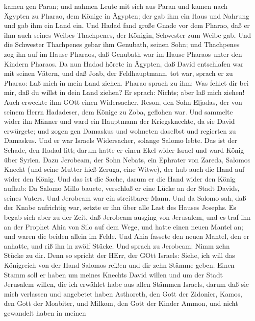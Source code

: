 kamen gen Paran; und nahmen Leute mit sich aus Paran und kamen nach
Ägypten zu Pharao, dem Könige in Ägypten; der gab ihm ein Haus und
Nahrung und gab ihm ein Land ein.  Und Hadad fand große
Gnade vor dem Pharao, daß er ihm auch seines Weibes Thachpenes, der
Königin, Schwester zum Weibe gab.  Und die Schwester
Thachpenes gebar ihm Genubath, seinen Sohn; und Thachpenes zog ihn auf
im Hause Pharaos, daß Genubath war im Hause Pharaos unter den Kindern
Pharaos.  Da nun Hadad hörete in Ägypten, daß David
entschlafen war mit seinen Vätern, und daß Joab, der Feldhauptmann, tot
war, sprach er zu Pharao: Laß mich in mein Land ziehen. 
Pharao sprach zu ihm: Was fehlet dir bei mir, daß du willst in dein Land
ziehen? Er sprach: Nichts; aber laß mich ziehen!  Auch
erweckte ihm GOtt einen Widersacher, Reson, den Sohn Eljadas, der von
seinem Herrn Hadadeser, dem Könige zu Zoba, geflohen war. 
Und sammelte wider ihn Männer und ward ein Hauptmann der Kriegsknechte,
da sie David erwürgete; und zogen gen Damaskus und wohneten daselbst und
regierten zu Damaskus.  Und er war Israels Widersacher,
solange Salomo lebte. Das ist der Schade, den Hadad litt; darum hatte er
einen Ekel wider Israel und ward König über Syrien.  Dazu
Jerobeam, der Sohn Nebats, ein Ephrater von Zareda, Salomos Knecht (und
seine Mutter hieß Zeruga, eine Witwe), der hub auch die Hand auf wider
den König.  Und das ist die Sache, darum er die Hand wider
den König aufhub: Da Salomo Millo bauete, verschloß er eine Lücke an der
Stadt Davids, seines Vaters.  Und Jerobeam war ein
streitbarer Mann. Und da Salomo sah, daß der Knabe aufrichtig war,
setzte er ihn über alle Last des Hauses Josephs.  Es begab
sich aber zu der Zeit, daß Jerobeam ausging von Jerusalem, und es traf
ihn an der Prophet Ahia von Silo auf dem Wege, und hatte einen neuen
Mantel an; und waren die beiden allein im Felde.  Und Ahia
fassete den neuen Mantel, den er anhatte, und riß ihn in zwölf Stücke.
 Und sprach zu Jerobeam: Nimm zehn Stücke zu dir. Denn so
spricht der HErr, der GOtt Israels: Siehe, ich will das Königreich von
der Hand Salomos reißen und dir zehn Stämme geben.  Einen
Stamm soll er haben um meines Knechts David willen und um der Stadt
Jerusalem willen, die ich erwählet habe aus allen Stämmen Israels,
 darum daß sie mich verlassen und angebetet haben
Asthoreth, den Gott der Zidonier, Kamos, den Gott der Moabiter, und
Milkom, den Gott der Kinder Ammon, und nicht gewandelt haben in meinen
